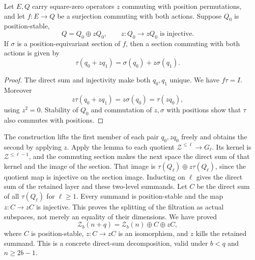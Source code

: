 \begin{lemma}\label{tx:lem:commuting-section}
Let $E,Q$ carry square-zero operators $z$ commuting with position permutations, and let $f:E\to Q$ be a surjection commuting with both actions. Suppose $Q_0$ is position-stable,
\[
                Q=Q_0\oplus zQ_0,
                \qquad z:Q_0\longrightarrow zQ_0\text{ is injective}.
\]
If $\sigma$ is a position-equivariant section of $f$, then a section commuting with both actions is given by
\[\tau(q_0+zq_1)=\sigma(q_0)+z\sigma(q_1).
\]
\end{lemma}
\begin{proof}
The direct sum and injectivity make both $q_0,q_1$ unique. We have $f\tau=I$. Moreover
\[z\tau(q_0+zq_1)=z\sigma(q_0)=\tau(zq_0),
\]
using $z^2=0$. Stability of $Q_0$ and commutation of $z,\sigma$ with positions show that $\tau$ also commutes with positions.
\end{proof}
The construction lifts the first member of each pair $q_0,zq_0$ freely and obtains the second by applying $z$. Apply the lemma to each quotient
$\mathcal Z^{\le \ell}\to G_\ell$. Its kernel is
$\mathcal Z^{\le \ell-1}$, and the commuting section makes the next
space the direct sum of that kernel and the image of the section.
That image is $\tau(Q_\ell)\oplus z\tau(Q_\ell)$, since the quotient map
is injective on the section image. Inducting on $\ell$ gives the direct
sum of the retained layer and these two-level summands. Let $C$ be
the direct sum of all $\tau(Q_\ell)$ for $\ell\ge1$. Every summand is
position-stable and the map $z:C\to zC$ is injective. This proves
the splitting of the filtration as actual subspaces, not merely
an equality of their dimensions. We have proved
\begin{equation}\label{tx:eq:socsplit2}
\mathcal Z_b(n+q)=\mathcal Z_b(n)\oplus C\oplus zC,
\end{equation}
where $C$ is position-stable, $z:C\to zC$ is an isomorphism, and $z$ kills the retained summand. This is a concrete direct-sum decomposition, valid under $b<q$ and $n\ge2b-1$.

